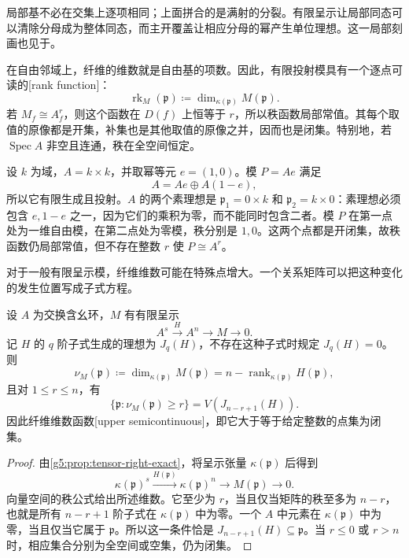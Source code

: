 局部基不必在交集上逐项相同；上面拼合的是满射的分裂。有限呈示让局部同态可以清除分母成为整体同态，而主开覆盖让相应分母的幂产生单位理想。这一局部刻画也见于\cite[第7节，定理7.12]{Matsumura1989}。

\ProseParagraphBreak

在自由邻域上，纤维的维数就是自由基的项数。因此，有限投射模具有一个逐点可读的[rank function]：
\[
	\operatorname{rk}_M(\mathfrak p)
	\coloneqq\dim_{\kappa(\mathfrak p)}M(\mathfrak p).
\]
若 \(M_f\cong A_f^r\)，则这个函数在 \(D(f)\) 上恒等于 \(r\)，所以秩函数局部常值。其每个取值的原像都是开集，补集也是其他取值的原像之并，因而也是闭集。特别地，若 \(\operatorname{Spec}A\) 非空且连通，秩在全空间恒定。

\begin{example}
\label{g5:exm:projective-varying-rank}
	设 \(k\) 为域，\(A=k\times k\)，并取幂等元 \(e=(1,0)\)。模 \(P=Ae\) 满足
	\[
		A=Ae\oplus A(1-e),
	\]
	所以它有限生成且投射。\(A\) 的两个素理想是 \(\mathfrak p_1=0\times k\) 和 \(\mathfrak p_2=k\times0\)：素理想必须包含 \(e,1-e\) 之一，因为它们的乘积为零，而不能同时包含二者。模 \(P\) 在第一点处为一维自由模，在第二点处为零模，秩分别是 \(1,0\)。这两个点都是开闭集，故秩函数仍局部常值，但不存在整数 \(r\) 使 \(P\cong A^r\)。
\end{example}

对于一般有限呈示模，纤维维数可能在特殊点增大。一个关系矩阵可以把这种变化的发生位置写成子式方程。

\begin{proposition}
\label{g5:prop:fiber-upper-semicontinuity}
	设 \(A\) 为交换含幺环，\(M\) 有有限呈示
	\[
		A^s\xrightarrow{H}A^n\longrightarrow M\longrightarrow0.
	\]
	记 \(H\) 的 \(q\) 阶子式生成的理想为 \(J_q(H)\)，不存在这种子式时规定 \(J_q(H)=0\)。则
	\[
		\nu_M(\mathfrak p)\coloneqq
		\dim_{\kappa(\mathfrak p)}M(\mathfrak p)
		=n-\operatorname{rank}_{\kappa(\mathfrak p)}H(\mathfrak p),
	\]
	且对 \(1\leq r\leq n\)，有
	\[
		\{\mathfrak p:\nu_M(\mathfrak p)\geq r\}
		=V(J_{n-r+1}(H)).
	\]
	因此纤维维数函数[upper semicontinuous]，即它大于等于给定整数的点集为闭集。
\end{proposition}
\begin{proof}
	由\cref{g5:prop:tensor-right-exact}，将呈示张量 \(\kappa(\mathfrak p)\) 后得到
	\[
		\kappa(\mathfrak p)^s\xrightarrow{H(\mathfrak p)}
		\kappa(\mathfrak p)^n\longrightarrow M(\mathfrak p)\longrightarrow0.
	\]
	向量空间的秩公式给出所述维数。它至少为 \(r\)，当且仅当矩阵的秩至多为 \(n-r\)，也就是所有 \(n-r+1\) 阶子式在 \(\kappa(\mathfrak p)\) 中为零。一个 \(A\) 中元素在 \(\kappa(\mathfrak p)\) 中为零，当且仅当它属于 \(\mathfrak p\)。所以这一条件恰是 \(J_{n-r+1}(H)\subseteq\mathfrak p\)。当 \(r\leq0\) 或 \(r>n\) 时，相应集合分别为全空间或空集，仍为闭集。
\end{proof}

